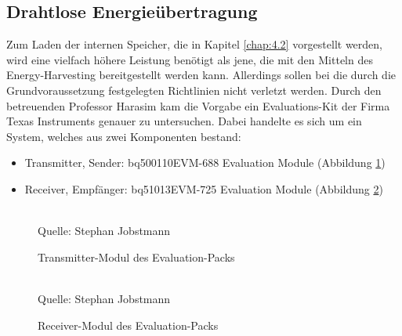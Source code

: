 \documentclass[12pt]{scrreprt} %
\begin{document}
\subsection{Drahtlose Energieübertragung}
\label{chap:4.1.2}
Zum Laden der internen Speicher, die in Kapitel \vref{chap:4.2} vorgestellt werden, wird eine vielfach höhere Leistung benötigt als jene, die mit den Mitteln des Energy-Harvesting bereitgestellt werden kann. Allerdings sollen bei die durch die Grundvoraussetzung festgelegten Richtlinien nicht verletzt werden. Durch den betreuenden Professor Harasim kam die Vorgabe ein Evaluations-Kit der Firma Texas Instruments genauer zu untersuchen. Dabei handelte es sich um ein System, welches aus zwei Komponenten bestand:
\begin{itemize}
\item
Transmitter, Sender: bq500110EVM-688 Evaluation Module (Abbildung \ref{BQ_transm})
\item
Receiver, Empfänger: bq51013EVM-725 Evaluation Module (Abbildung \ref{BQ_rec})
\end{itemize}
\begin{figure}
\caption{Transmitter-Modul des Evaluation-Packs}
\centering
{}
\\Quelle: Stephan Jobstmann
\label{BQ_transm}
\end{figure}
\begin{figure}
\centering
\caption{Receiver-Modul des Evaluation-Packs}
\\Quelle: Stephan Jobstmann
\label{BQ_rec}
\end{figure}
\end{document}
